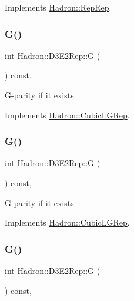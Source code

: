 Implements \mbox{\hyperlink{structHadron_1_1RepRep_a92c8802e5ed7afd7da43ccfd5b7cd92b}{Hadron\+::\+Rep\+Rep}}.

\mbox{\label{structHadron_1_1D3E2Rep_a8bfbc6b5f5972d0b979d0a730583c795}} 
\subsubsection{\texorpdfstring{G()}{G()}\hspace{0.1cm}{\footnotesize\ttfamily [1/3]}}
{\footnotesize\ttfamily int Hadron\+::\+D3\+E2\+Rep\+::G (\begin{DoxyParamCaption}{ }\end{DoxyParamCaption}) const\hspace{0.3cm}{\ttfamily [inline]}, {\ttfamily [virtual]}}

G-\/parity if it exists 

Implements \mbox{\hyperlink{structHadron_1_1CubicLGRep_ace26f7b2d55e3a668a14cb9026da5231}{Hadron\+::\+Cubic\+L\+G\+Rep}}.

\mbox{\label{structHadron_1_1D3E2Rep_a8bfbc6b5f5972d0b979d0a730583c795}} 
\subsubsection{\texorpdfstring{G()}{G()}\hspace{0.1cm}{\footnotesize\ttfamily [2/3]}}
{\footnotesize\ttfamily int Hadron\+::\+D3\+E2\+Rep\+::G (\begin{DoxyParamCaption}{ }\end{DoxyParamCaption}) const\hspace{0.3cm}{\ttfamily [inline]}, {\ttfamily [virtual]}}

G-\/parity if it exists 

Implements \mbox{\hyperlink{structHadron_1_1CubicLGRep_ace26f7b2d55e3a668a14cb9026da5231}{Hadron\+::\+Cubic\+L\+G\+Rep}}.

\mbox{\label{structHadron_1_1D3E2Rep_a8bfbc6b5f5972d0b979d0a730583c795}} 
\subsubsection{\texorpdfstring{G()}{G()}\hspace{0.1cm}{\footnotesize\ttfamily [3/3]}}
{\footnotesize\ttfamily int Hadron\+::\+D3\+E2\+Rep\+::G (\begin{DoxyParamCaption}{ }\end{DoxyParamCaption}) const\hspace{0.3cm}{\ttfamily [inline]}, {\ttfamily [virtual]}}

